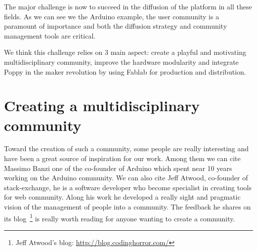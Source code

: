 
The major challenge is now to succeed in the diffusion of the platform in all these fields. As we can see we the Arduino example, the user community is a paramount of importance and both the diffusion strategy and community management tools are critical.

We think this challenge relies on 3 main aspect: create a playful and motivating multidisciplinary community, improve the hardware modularity and integrate Poppy in the maker revolution by using Fablab for production and distribution.








\section{Creating a multidisciplinary community} %
\label{sec:creating_a_multi}

Toward the creation of such a community, some people are really interesting and have been a great source of inspiration for our work. Among them we can cite Massimo Banzi one of the co-founder of Arduino which spent near 10 years working on the Arduino community. We can also cite Jeff Atwood, co-founder of stack-exchange, he is a software developer who become specialist in creating tools for web community. Along his work he developed a really sight and pragmatic vision of the management of people into a community. The feedback he shares on its blog~\footnote{Jeff Atwood's blog: \url{http://blog.codinghorror.com/}} is really worth reading for anyone wanting to create a community.

